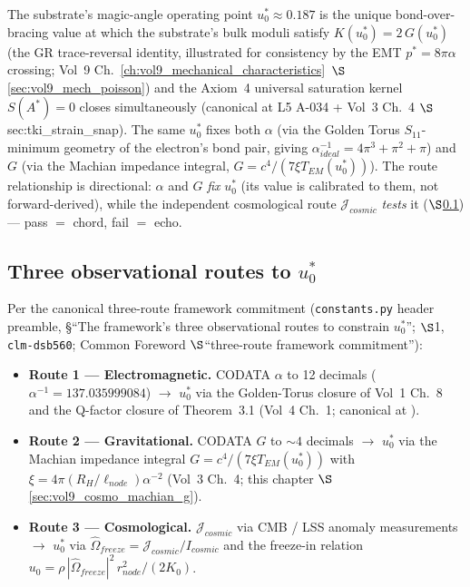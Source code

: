 The substrate's magic-angle operating point $u_0^* \approx 0.187$ is the unique bond-over-bracing value at which the substrate's bulk moduli satisfy $K(u_0^*) = 2\, G(u_0^*)$ (the GR trace-reversal identity, illustrated for consistency by the EMT $p^* = 8\pi\alpha$ crossing; Vol~9 Ch.~\ref{ch:vol9_mechanical_characteristics}~$\S$\ref{sec:vol9_mech_poisson}) and the Axiom~4 universal saturation kernel $S(A^*) = 0$ closes simultaneously (canonical at L5 A-034 + Vol~3 Ch.~4 $\S$sec:tki\_strain\_snap). The same $u_0^*$ fixes both $\alpha$ (via the Golden Torus $S_{11}$-minimum geometry of the electron's bond pair, giving $\alpha^{-1}_{ideal} = 4\pi^3 + \pi^2 + \pi$) and $G$ (via the Machian impedance integral, $G = c^4 / (7\xi T_{EM}(u_0^*))$). The route relationship is directional: $\alpha$ and $G$ \emph{fix} $u_0^*$ (its value is calibrated to them, not forward-derived), while the independent cosmological route $\mathcal{J}_{cosmic}$ \emph{tests} it ($\S$\ref{subsec:vol9_cosmo_three_routes}) --- pass $=$ chord, fail $=$ echo.

\subsection{Three observational routes to $u_0^*$}
\label{subsec:vol9_cosmo_three_routes}

Per the canonical three-route framework commitment (\texttt{constants.py} header preamble, \S``The framework's three observational routes to constrain $u_0^*$'';  $\S$1, \texttt{clm-dsb560}; Common Foreword $\S$``three-route framework commitment''):

\begin{itemize}
    \item \textbf{Route 1 --- Electromagnetic.} CODATA $\alpha$ to 12 decimals ($\alpha^{-1} = 137.035999084$) $\to$ $u_0^*$ via the Golden-Torus closure of Vol~1 Ch.~8 and the Q-factor closure of Theorem~3.1 (Vol~4 Ch.~1; canonical at ).
    \item \textbf{Route 2 --- Gravitational.} CODATA $G$ to $\sim 4$ decimals $\to$ $u_0^*$ via the Machian impedance integral $G = c^4 / (7\xi T_{EM}(u_0^*))$ with $\xi = 4\pi (R_H/\ell_{node}) \alpha^{-2}$ (Vol~3 Ch.~4; this chapter $\S$\ref{sec:vol9_cosmo_machian_g}).
    \item \textbf{Route 3 --- Cosmological.} $\mathcal{J}_{cosmic}$ via CMB / LSS anomaly measurements $\to$ $u_0^*$ via $\hat{\Omega}_{freeze} = \mathcal{J}_{cosmic} / I_{cosmic}$ and the freeze-in relation $u_0 = \rho\, |\hat{\Omega}_{freeze}|^2\, r_{node}^2 / (2K_0)$.
\end{itemize}

